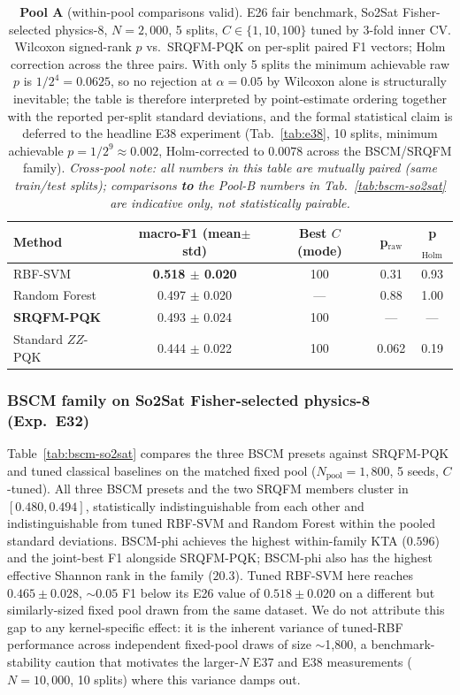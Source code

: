 \documentclass[pdflatex,sn-mathphys]{sn-jnl}
\theoremstyle{plain}
\theoremstyle{remark}
\theoremstyle{definition}
\begin{document}
\begin{table}[htbp]
\caption{\textbf{Pool A} (within-pool comparisons valid). E26 fair benchmark, So2Sat Fisher-selected physics-8, $N=2{,}000$, 5 splits, $C\in \{1,10,100\}$ tuned by 3-fold inner CV. Wilcoxon signed-rank $p$ vs.\ SRQFM-PQK on per-split paired F1 vectors; Holm correction across the three pairs. With only 5 splits the minimum achievable raw $p$ is $1/2^{4}=0.0625$, so no rejection at $\alpha=0.05$ by Wilcoxon alone is structurally inevitable; the table is therefore interpreted by point-estimate ordering together with the reported per-split standard deviations, and the formal statistical claim is deferred to the headline E38 experiment (Tab.~\ref{tab:e38}, 10 splits, minimum achievable $p=1/2^{9}\approx 0.002$, Holm-corrected to $0.0078$ across the BSCM/SRQFM family).  \emph{Cross-pool note: all numbers in this table are mutually paired (same train/test splits); comparisons \textbf{to} the Pool-B numbers in Tab.~\ref{tab:bscm-so2sat} are indicative only, not statistically pairable.}}
\label{tab:e26}
\begin{tabular}{lcccc}
\toprule
Method & macro-F1 (mean$\pm$std) & Best $C$ (mode) & p$_\text{raw}$ & p$_\text{Holm}$ \\
\midrule
RBF-SVM        & \textbf{0.518 $\pm$ 0.020} & 100  & 0.31  & 0.93 \\
Random Forest  & 0.497 $\pm$ 0.020 & ---  & 0.88  & 1.00 \\
\textbf{SRQFM-PQK} & 0.493 $\pm$ 0.024 & 100  & ---   & ---  \\
Standard $ZZ$-PQK & 0.444 $\pm$ 0.022 & 100  & 0.062 & 0.19 \\
\bottomrule
\end{tabular}
\end{table}

\subsubsection{BSCM family on So2Sat Fisher-selected physics-8 (Exp.\ E32)}\label{sec:bscm-results}
Table~\ref{tab:bscm-so2sat} compares the three BSCM presets against SRQFM-PQK and tuned classical baselines on the matched fixed pool ($N_{\text{pool}}=1{,}800$, 5 seeds, $C$-tuned). All three BSCM presets and the two SRQFM members cluster in $[0.480,0.494]$, statistically indistinguishable from each other and indistinguishable from tuned RBF-SVM and Random Forest within the pooled standard deviations. BSCM-phi achieves the highest within-family KTA ($0.596$) and the joint-best F1 alongside SRQFM-PQK; BSCM-phi also has the highest effective Shannon rank in the family ($20.3$). Tuned RBF-SVM here reaches $0.465\pm 0.028$, $\sim\!0.05$ F1 below its E26 value of $0.518\pm 0.020$ on a different but similarly-sized fixed pool drawn from the same dataset. We do not attribute this gap to any kernel-specific effect: it is the inherent variance of tuned-RBF performance across independent fixed-pool draws of size $\sim$1{,}800, a benchmark-stability caution that motivates the larger-$N$ E37 and E38 measurements ($N=10{,}000$, 10 splits) where this variance damps out.
\end{document}
